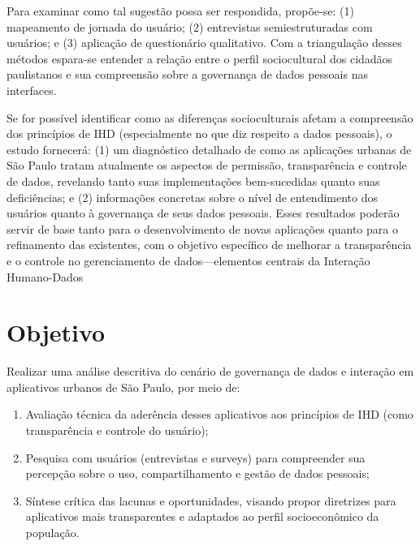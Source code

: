 \documentclass[
	12pt,				%
	oneside,			%
	a4paper,			%
	english,			%
	brazil				%
	]{abntex2ppgsi}
\begin{document}
  Para examinar como tal sugestão possa ser respondida, propõe-se: (1) mapeamento de jornada do usuário; (2) entrevistas semiestruturadas com usuários; e (3) aplicação de questionário qualitativo. Com a triangulação desses métodos espara-se entender a relação entre o perfil sociocultural dos cidadãos paulistanos e sua compreensão sobre a governança de dados pessoais nas interfaces.

Se for possível identificar como as diferenças socioculturais afetam a compreensão dos princípios de IHD (especialmente no que diz respeito a dados pessoais), o estudo fornecerá: (1) um diagnóstico detalhado de como as aplicações urbanas de São Paulo tratam atualmente os aspectos de permissão, transparência e controle de dados, revelando tanto suas implementações bem-sucedidas quanto suas deficiências; e (2) informações concretas sobre o nível de entendimento dos usuários quanto à governança de seus dados pessoais. Esses resultados poderão servir de base tanto para o desenvolvimento de novas aplicações quanto para o refinamento das existentes, com o objetivo específico de melhorar a transparência e o controle no gerenciamento de dados---elementos centrais da Interação Humano-Dados

    
  \section{Objetivo}
  
    Realizar uma análise descritiva do cenário de governança de dados e interação em aplicativos urbanos de São Paulo, por meio de:
    \begin{enumerate}
    \item Avaliação técnica da aderência desses aplicativos aos princípios de IHD (como transparência e controle do usuário);

    \item Pesquisa com usuários (entrevistas e surveys) para compreender sua percepção sobre o uso, compartilhamento e gestão de dados pessoais;

    \item Síntese crítica das lacunas e oportunidades, visando propor diretrizes para aplicativos mais transparentes e adaptados ao perfil socioeconômico da população.
    
    \end{enumerate} 
\end{document}
